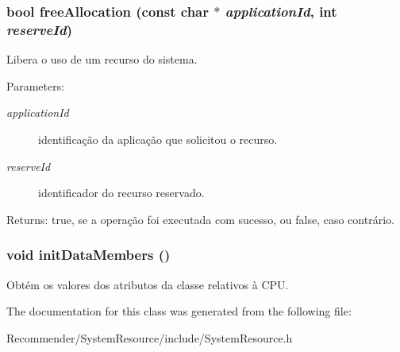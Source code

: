 \subsubsection{\setlength{\rightskip}{0pt plus 5cm}bool freeAllocation (const char $\ast$ {\em applicationId}, int {\em reserveId})}\label{classbr_1_1ufscar_1_1lince_1_1ginga_1_1recommender_1_1SystemResource_2e6480a59fce41bd5ca4095a1a3b44c8}


Libera o uso de um recurso do sistema. \begin{Desc}
\item[Parameters:]
\begin{description}
\item[{\em applicationId}]identificação da aplicação que solicitou o recurso. \item[{\em reserveId}]identificador do recurso reservado. \end{description}
\end{Desc}
\begin{Desc}
\item[Returns:]true, se a operação foi executada com sucesso, ou false, caso contrário. \end{Desc}
\subsubsection{\setlength{\rightskip}{0pt plus 5cm}void initDataMembers ()\hspace{0.3cm}{\tt  [private]}}\label{classbr_1_1ufscar_1_1lince_1_1ginga_1_1recommender_1_1SystemResource_d9a3235fc736298adcf13c6b9a793f8f}


Obtém os valores dos atributos da classe relativos à CPU. 

The documentation for this class was generated from the following file:\begin{CompactItemize}
\item 
Recommender/SystemResource/include/SystemResource.h\end{CompactItemize}
